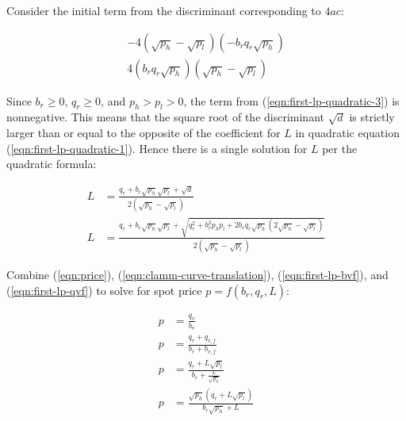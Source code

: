 \documentclass[table, twocolumn]{article}
\begin{document}
Consider the initial term from the discriminant corresponding to $4ac$:

\begin{align} \label{eqn:first-lp-quadratic-3}
  - 4(\sqrt{p_h} - \sqrt{p_l})(-b_r q_r \sqrt{p_h}) \nonumber \\
  4(b_r q_r \sqrt{p_h})(\sqrt{p_h} - \sqrt{p_l})
\end{align}

Since $b_r \geq 0$, $q_r \geq 0$, and $p_h > p_l > 0$, the term from
(\ref{eqn:first-lp-quadratic-3}) is nonnegative. This means that the square root of the
discriminant $\sqrt{d}$ is strictly larger than or equal to the opposite of the
coefficient for $L$ in quadratic equation (\ref{eqn:first-lp-quadratic-1}). Hence there
is a single solution for $L$ per the quadratic formula:

\begin{align} \label{eqn:first-lp-quadratic-4}
  L & = \frac{q_r + b_r \sqrt{p_h} \sqrt{p_l} + \sqrt{d}}
  {2(\sqrt{p_h} - \sqrt{p_l})} \nonumber                  \\
  L & = \frac{q_r + b_r \sqrt{p_h} \sqrt{p_l} + \sqrt{
      q_r^2 + b_r^2 p_h p_l + 2 b_r q_r \sqrt{p_h} (2 \sqrt{p_h} - \sqrt{p_l})
    }} {2(\sqrt{p_h} - \sqrt{p_l})}
\end{align}

Combine (\ref{eqn:price}), (\ref{eqn:clamm-curve-translation}),
(\ref{eqn:first-lp-bvf}), and (\ref{eqn:first-lp-qvf}) to solve for spot price
$p = f(b_r, q_r, L)$:

\begin{align} \label{eqn:first-lp-spot-price}
  p &= \frac{q_v}{b_v} \nonumber \\
  p &= \frac{q_r + q_{v, f}}{b_r + b_{v, f}} \nonumber \\
  p &= \frac{q_r + L \sqrt{p_l}}{b_r + \frac{L}{\sqrt{p_h}}} \nonumber \\
  p &= \frac{\sqrt{p_h}(q_r + L \sqrt{p_l})}{b_r \sqrt{p_h} + L}
\end{align}
\end{document}
